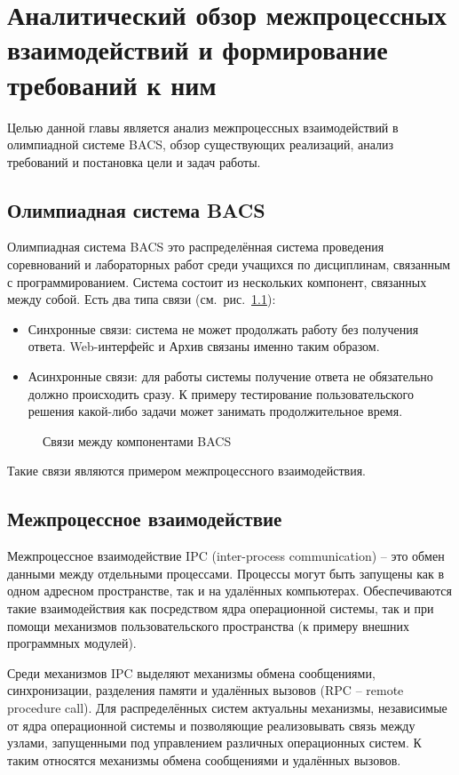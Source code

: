 \chapter{Аналитический обзор межпроцессных взаимодействий
и формирование требований к ним}

Целью данной главы является анализ межпроцессных взаимодействий
в олимпиадной системе BACS, обзор существующих реализаций,
анализ требований и постановка цели и задач работы.

\section{Олимпиадная система BACS}
Олимпиадная система BACS это распределённая система проведения соревнований
и лабораторных работ среди учащихся по дисциплинам, связанным
с программированием. Система состоит из нескольких компонент,
связанных между собой. Есть два типа связи (см.~рис.~\ref{fig:bacsbasicrpc}):
\begin{itemize}
    \item Синхронные связи: система не может продолжать работу
        без получения ответа. Web-интерфейс и Архив связаны именно таким
        образом.
    \item Асинхронные связи: для работы системы получение ответа не обязательно
        должно происходить сразу. К примеру тестирование пользовательского
        решения какой-либо задачи может занимать продолжительное время.
\end{itemize}

\begin{figure}[H]
    \centering
    
    \caption{Связи между компонентами BACS}
    \label{fig:bacsbasicrpc}
\end{figure}

Такие связи являются примером межпроцессного взаимодействия.

\section{Межпроцессное взаимодействие}
Межпроцессное взаимодействие IPC (inter-process communication) --
это обмен данными между отдельными процессами.
Процессы могут быть запущены как в одном адресном пространстве,
так и на удалённых компьютерах. Обеспечиваются такие взаимодействия
как посредством ядра операционной системы, так и при помощи механизмов
пользовательского пространства (к примеру внешних программных модулей).

Среди механизмов IPC выделяют механизмы обмена сообщениями, синхронизации,
разделения памяти и удалённых вызовов (RPC -- remote procedure call).
Для распределённых систем актуальны механизмы, независимые от ядра операционной
системы и позволяющие реализовывать связь между узлами, запущенными
под управлением различных операционных систем. К таким относятся механизмы
обмена сообщениями и удалённых вызовов.

